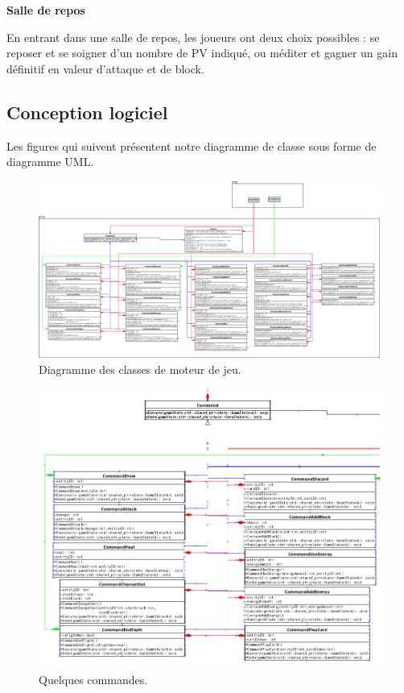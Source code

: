 \textbf{Salle de repos}

En entrant dans une salle de repos, les joueurs ont deux choix possibles : se reposer et se soigner d'un nombre de PV indiqué, ou méditer et gagner un gain définitif en valeur d'attaque et de block. 

\clearpage
\subsection{Conception logiciel}

Les figures qui suivent présentent notre diagramme de classe sous forme de diagramme UML.


\begin{landscape}
\begin{figure}[p]
\includegraphics[width=0.9\paperheight]{images/engine.png}
\caption{\label{uml:engine}Diagramme des classes de moteur de jeu.} 
\end{figure}
\end{landscape}

\newpage
\begin{figure}[p]
\includegraphics[width=0.6\paperheight]{images/engine1.png}
\caption{\label{uml:engine}Quelques commandes.} 
\end{figure}
\newpage



